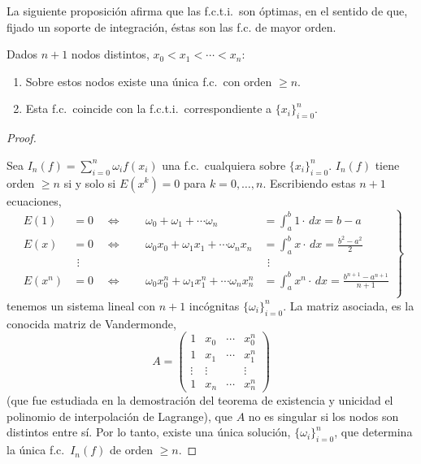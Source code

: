 La siguiente proposición afirma que las f.c.t.i.\ son óptimas, en el
sentido de que, fijado un soporte de integración, éstas son las f.c.
de mayor orden.
\begin{proposition}
  \label{pro:existencia.fcti}
  Dados $n+1$ nodos distintos, $x_0<x_1<\cdots<x_n$:
  \begin{enumerate}
  \item Sobre estos nodos existe una única f.c.\ con orden $\ge
    n$.
  \item Esta f.c.\ coincide con la f.c.t.i.\ correspondiente a
    $\{x_i\}_{i=0}^n$.
  \end{enumerate}
\end{proposition}
\begin{proof}~\par
   Sea $I_n(f)=\sum_{i=0}^n \omega_i f(x_i)$ una
  f.c.\ cualquiera sobre $\{x_i\}_{i=0}^n$. $I_n(f)$ tiene orden $\ge
  n$ si y solo si $E(x^k)=0$ para $k=0,\dots,n$. Escribiendo estas $n+1$
  ecuaciones,
  \begin{equation}
    \left.
  \begin{alignedat}{2} %
    E(1)&=0 \quad \Leftrightarrow\ \quad &
    \omega_0 + \omega_1 + \cdots \omega_n &=
    \int_a^b 1\cdot\,dx = b-a
    \\
    E(x)&=0 \quad \Leftrightarrow\ \quad &
    \omega_0 x_0 + \omega_1 x_1 + \cdots \omega_n x_n &=
    \int_a^b x \cdot\,dx = \frac{b^2-a^2}{2}
    \\
    &\ \, \vdots & &\ \, \vdots
    \\
    E(x^n)&=0 \quad \Leftrightarrow\ \quad &
    \omega_0 x_0^n + \omega_1 x_1^n + \cdots \omega_n x_n^n &=
    \int_a^b x^n \cdot\,dx = \frac{b^{n+1}-a^{n+1}}{n+1}
    \\
  \end{alignedat}
  \right\}
  \label{eq:sl.fcti}
\end{equation}
  tenemos un sistema lineal con $n+1$ incógnitas
  $\{\omega_i\}_{i=0}^n$. La matriz asociada, es la conocida matriz de
  Vandermonde,
  \begin{equation*}
    A =
    \begin{pmatrix}
      1 & x_0& \cdots & x_0^n \\
      1 & x_1& \cdots & x_1^n \\
      \vdots & \vdots & & \vdots \\
      1 & x_n& \cdots & x_n^n
    \end{pmatrix}
  \end{equation*}
  (que fue estudiada en la demostración del teorema de existencia y
  unicidad el polinomio de interpolación de Lagrange), que $A$ no es
  singular si los nodos son distintos entre sí.  Por lo tanto, existe
  una única solución, $\{\omega_i\}_{i=0}^n$, que determina la única
  f.c.\ $I_n(f)$ de orden $\ge n$.


\end{proof}
